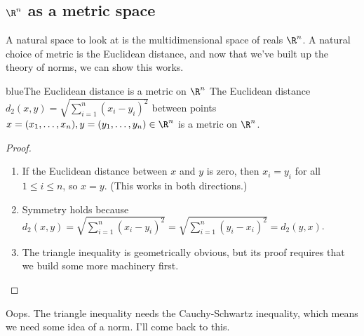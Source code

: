 \documentclass[../analysis.tex]{subfiles}
\begin{document}
    \subsection{$\R^n$ as a metric space}

    A natural space to look at is the multidimensional space of reals $\R^n$. A natural choice of metric is the Euclidean distance, and now that we've built up the theory of norms, we can show this works.

    \begin{mycolorbox}{blue}{The Euclidean distance is a metric on $\R^n$}
        The Euclidean distance $d_2(x, y) = \sqrt{\sum_{i=1}^n (x_i - y_i)^2}$ between points $x = (x_1, \dots, x_n), y = (y_1, \dots, y_n) \in \R^n$ is a metric on $\R^n$.
    \end{mycolorbox}

    \begin{proof}
        \begin{enumerate}
            \item If the Euclidean distance between $x$ and $y$ is zero, then $x_i = y_i$ for all $1 \leq i \leq n$, so $x = y$. (This works in both directions.)
            \item Symmetry holds because $d_2(x, y) = \sqrt{\sum_{i=1}^n (x_i - y_i)^2} = \sqrt{\sum_{i=1}^n (y_i - x_i)^2} = d_2(y, x)$.
            \item The triangle inequality is geometrically obvious, but its proof requires that we build some more machinery first.
        \end{enumerate}
    \end{proof}

    Oops. The triangle inequality needs the Cauchy-Schwartz inequality, which means we need some idea of a norm. I'll come back to this.
\end{document}
